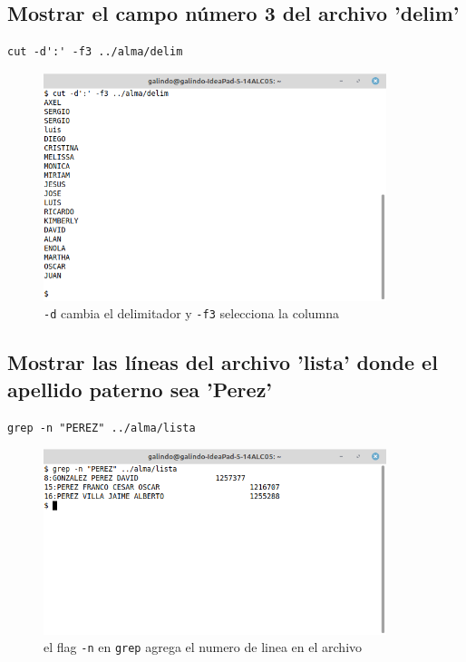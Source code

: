 \documentclass[11pt]{article}
\begin{document}
\pagebreak

\subsection{Mostrar el campo número 3 del archivo 'delim'}
\label{sec:orga970066}
\begin{verbatim}
cut -d':' -f3 ../alma/delim
\end{verbatim}

\begin{figure}[htbp]
\centering
\includegraphics[width=10cm]{img/a26.png}
\caption[\texttt{-f3}]{\texttt{-d} cambia el delimitador y \texttt{-f3} selecciona la columna}
\end{figure}

\subsection{Mostrar las líneas del archivo 'lista' donde el apellido paterno sea 'Perez'}
\label{sec:org143d236}
\begin{verbatim}
grep -n "PEREZ" ../alma/lista
\end{verbatim}

\begin{figure}[htbp]
\centering
\includegraphics[width=10cm]{img/a27.png}
\caption[\texttt{grep}]{el flag \texttt{-n} en \texttt{grep} agrega el numero de linea en el archivo}
\end{figure}
\end{document}
